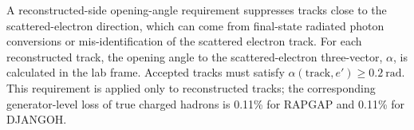 A reconstructed-side opening-angle requirement suppresses tracks close to the
scattered-electron direction, which can come from final-state radiated photon conversions or mis-identification of the scattered electron track.  For each reconstructed track, the opening angle
to the scattered-electron three-vector, $\alpha$, is calculated in the lab frame. Accepted tracks must satisfy
$\alpha(\mathrm{track},e') \ge 0.2~\mathrm{rad}$.  This requirement is applied
only to reconstructed tracks; the corresponding generator-level loss of true charged hadrons is 0.11\% for RAPGAP and 0.11\% for DJANGOH.
